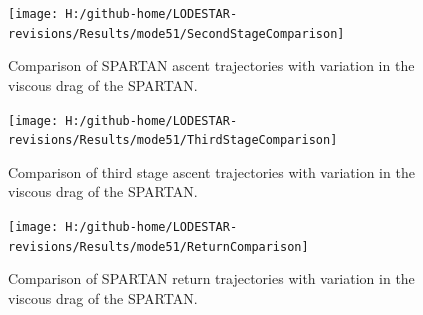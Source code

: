 \begin{figure}[!th]
\centering
\texttt{[image: H:/github-home/LODESTAR-revisions/Results/mode51/SecondStageComparison]}
\caption{Comparison of SPARTAN ascent trajectories with variation in the viscous drag of the SPARTAN.}
\label{fig:SecondStageComparison-}
\end{figure}
\begin{figure}[!th]
\centering
\texttt{[image: H:/github-home/LODESTAR-revisions/Results/mode51/ThirdStageComparison]}
\caption{Comparison of third stage ascent trajectories with variation in the viscous drag of the SPARTAN.}
\label{fig:ThirdStageComparison-}
\end{figure}


\begin{figure}[!th]
	\centering
	\texttt{[image: H:/github-home/LODESTAR-revisions/Results/mode51/ReturnComparison]}
	\caption{Comparison of SPARTAN return trajectories with variation in the viscous drag of the SPARTAN.}
	\label{fig:ReturnComparison-}
\end{figure}
